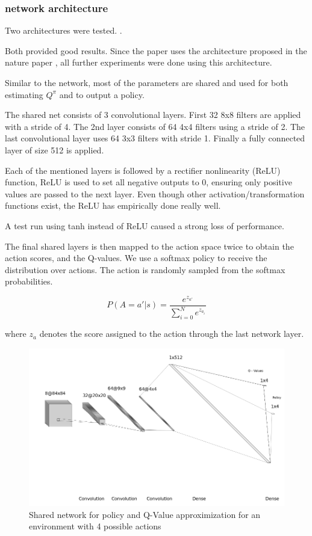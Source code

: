 \subsubsection{network architecture}

Two architectures were tested. \citep{mnih2015atari} \citep{nature}.

Both provided good results. Since the paper uses the architecture proposed in the nature paper \citep{nature}, all further experiments were done using this architecture.

Similar to the \citep{A3C} network, most of the parameters are shared and used for both estimating $Q^\pi$ and to output a policy.

The shared net consists of 3 convolutional layers.
First 32 8x8 filters are applied with a stride of 4.
The 2nd layer consists of 64 4x4 filters using a stride of 2.
The last convolutional layer uses 64 3x3 filters with stride 1.
Finally a fully connected layer of size 512 is applied.

Each of the mentioned layers is followed by a rectifier nonlinearity (ReLU) function, ReLU is used to set all negative outputs to 0, ensuring only positive values are passed to the next layer.
Even though other activation/transformation functions exist, the ReLU has empirically done really well. 

A test run using tanh instead of ReLU caused a strong loss of performance.

The final shared layers is then mapped to the action space twice to obtain the action scores, and the Q-values. We use a softmax policy to receive the distribution over actions.
The action is randomly sampled from the softmax probabilities.

\begin{equation}
P(A = a' | s ) = \frac{e^{z_{a'}}}{\sum^N_{i=0}e^{z_{a_i}}} 
\end{equation}

where $z_{a}$ denotes the score assigned to the action through the last network layer.


\begin{figure}
\includegraphics[scale=0.5]{bilder/nn2.png}
\caption{Shared network for policy and Q-Value approximization for an environment with 4 possible actions}
\end{figure}

